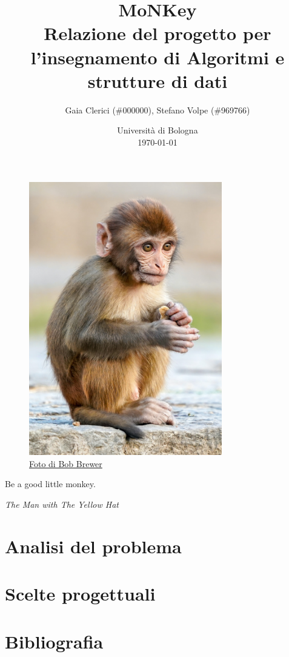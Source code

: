 \documentclass[a4paper]{article}
\title{MoNKey \\
\small Relazione del progetto per l'insegnamento di Algoritmi e strutture di
dati}
\author{
  Gaia Clerici (\#000000),
  Stefano Volpe (\#969766)
}
\date{
	Universit\`a di Bologna \\
  \today
}
\begin{document}
\maketitle

\begin{figure}[h]
  \includegraphics[width=0.75\textwidth]{monkey}
  \centering
  \caption{\href{https://unsplash.com/photos/daC7ji1EMHM}{Foto di Bob Brewer}}
\end{figure}

\pagebreak

\epigraph{Be a good little monkey.}{\textit{The Man with The Yellow Hat}}

\section{Analisi del problema}

\section{Scelte progettuali}

\section{Bibliografia}
\end{document}
